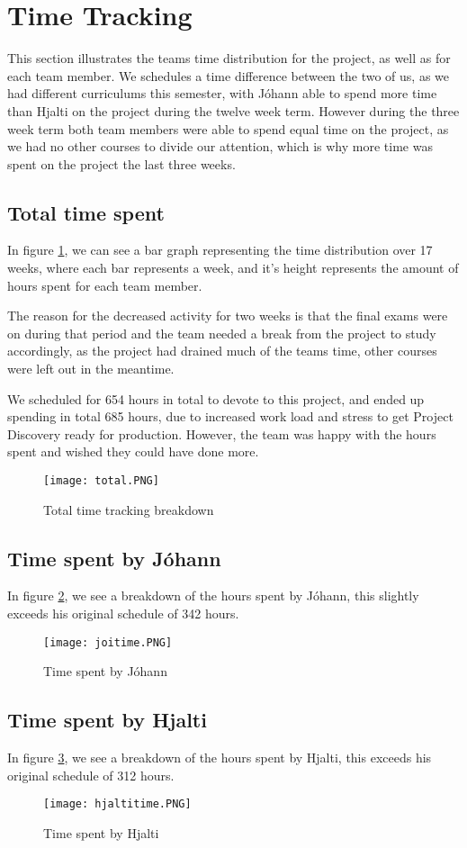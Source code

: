 \section{Time Tracking}\label{sec:timetracking}
This section illustrates the teams time distribution for the project, as well as for each team member. We schedules a time difference between the two of us, as we had different curriculums this semester, with Jóhann able to spend more time than Hjalti on the project during the twelve week term. However during the three week term both team members were able to spend equal time on the project, as we had no other courses to divide our attention, which is why more time was spent on the project the last three weeks.

\subsection{Total time spent}
In figure \ref{fig:totaltime}, we can see a bar graph representing the time distribution over 17 weeks, where each bar represents a week, and it's height represents the amount of hours spent for each team member. 

The reason for the decreased activity for two weeks is that the final exams were on during that period and the team needed a break from the project to study accordingly, as the project had drained much of the teams time, other courses were left out in the meantime.

We scheduled for 654 hours in total to devote to this project, and ended up spending in total 685 hours, due to increased work load and stress to get Project Discovery ready for production. However, the team was happy with the hours spent and wished they could have done more.

\begin{figure}[H]
	\centering
	\graphicspath{ {./graphics/} }
    \centerline{\texttt{[image: total.PNG]}}
    \caption{\label{fig:totaltime}Total time tracking breakdown}
\end{figure}

\subsection{Time spent by Jóhann}
In figure \ref{fig:joitime}, we see a breakdown of the hours spent by Jóhann, this slightly exceeds his original schedule of 342 hours.
\begin{figure}[H]
	\centering
	\graphicspath{ {./graphics/} }
    \centerline{\texttt{[image: joitime.PNG]}}
    \caption{\label{fig:joitime}Time spent by Jóhann}
\end{figure}

\subsection{Time spent by Hjalti}
In figure \ref{fig:hjaltitime}, we see a breakdown of the hours spent by Hjalti, this exceeds his original schedule of 312 hours. 
\begin{figure}[H]
	\centering
	\graphicspath{ {./graphics/} }
    \centerline{\texttt{[image: hjaltitime.PNG]}}
    \caption{\label{fig:hjaltitime}Time spent by Hjalti}
\end{figure}